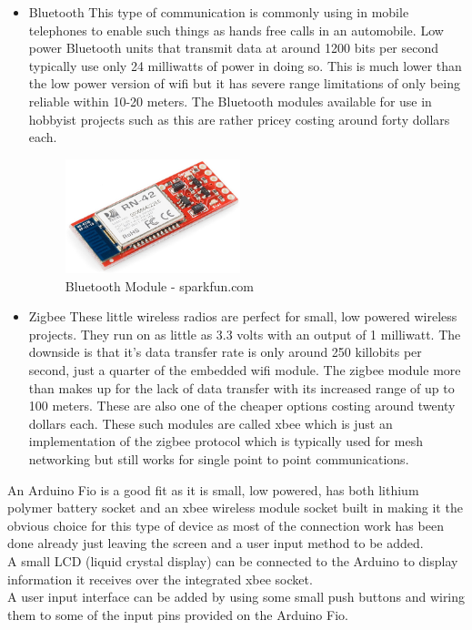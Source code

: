 \begin{itemize}
\item Bluetooth
This type of communication is commonly using in mobile telephones to enable such things as hands free calls in an automobile.  Low power Bluetooth units that transmit data at around 1200 bits per second typically use only 24 milliwatts of power in doing so.  This is much lower than the low power version of wifi but it has severe range limitations of only being reliable within 10-20 meters.  The Bluetooth modules available for use in hobbyist projects such as this are rather pricey costing around forty dollars each.
\begin{figure}[H]
\centering
        \includegraphics[width=2.0in] {Images/bluetooth.jpg}
        \caption{Bluetooth Module - sparkfun.com}
        \label{Bluetooth Module}
\end{figure}
\item Zigbee
These little wireless radios are perfect for small, low powered wireless projects.  They run on as little as 3.3 volts with an output of 1 milliwatt.  The downside is that it's data transfer rate is only around 250 killobits per second, just a quarter of the embedded wifi module.  The zigbee module more than makes up for the lack of data transfer with its increased range of up to 100 meters.  These are also one of the cheaper options costing around twenty dollars each.  These such modules are called xbee which is just an implementation of the zigbee protocol which is typically used for mesh networking but still works for single point to point communications.
\end{itemize}
An Arduino Fio is a good fit as it is small, low powered, has both lithium polymer battery socket and an xbee wireless module socket built in making it the obvious choice for this type of device as most of the connection work has been done already just leaving the screen and a user input method to be added.
\\A small LCD (liquid crystal display) can be connected to the Arduino to display information it receives over the integrated xbee socket.
\\A user input interface can be added by using some small push buttons and wiring them to some of the input pins provided on the Arduino Fio.

